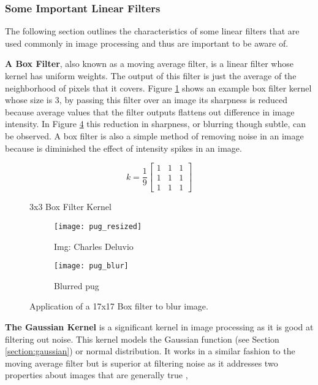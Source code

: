 \subsubsection{Some Important Linear Filters}
\label{subsubsection:kernels}

The following section outlines the characteristics of some linear filters that are used commonly in image processing and thus are important to be aware of. 

\textbf{A Box Filter}, also known as a moving average filter, is a linear filter whose kernel has uniform weights. The output of this filter is just the average of the neighborhood of pixels that it covers. Figure \ref{fig:box_kernel} shows an example box filter kernel whose size is 3, by passing this filter over an image its sharpness is reduced because average values that the filter outputs flattens out difference in image intensity. In Figure \ref{fig:pug_blur} this reduction in sharpness, or blurring though subtle, can be observed. A box filter is also a simple method of removing noise in an image because is diminished the effect of intensity spikes in an image. 

\begin{figure}[H]
   \centering
   \[k =
     \frac{1}{9}
   \begin{bmatrix}
      1 & 1 & 1 \\
      1 & 1 & 1 \\
      1 & 1 & 1
   \end{bmatrix}
   \]
   \caption{3x3 Box Filter Kernel}
   \label{fig:box_kernel}
\end{figure}

\begin{figure}[H]
    \centering
    \begin{subfigure}[b]{0.3\textwidth}
        \texttt{[image: pug\_resized]}
        \caption{Img: Charles Deluvio}
        \label{fig:pug_noise}
    \end{subfigure}
    \begin{subfigure}[b]{0.3\textwidth}
        \texttt{[image: pug\_blur]}
        \caption{Blurred pug}
        \label{fig:pug_denoised}
    \end{subfigure}
    \caption{Application of a 17x17 Box filter to blur image.}
    \label{fig:pug_blur}
\end{figure}

\textbf{The Gaussian Kernel} is a significant kernel in image processing as it is good at filtering out noise. This kernel models the Gaussian function (see Section \ref{section:gaussian}) or normal distribution. It works in a similar fashion to the moving average filter but is superior at filtering noise as it addresses two properties about images that are generally true \cite{udacity_cv}, 

